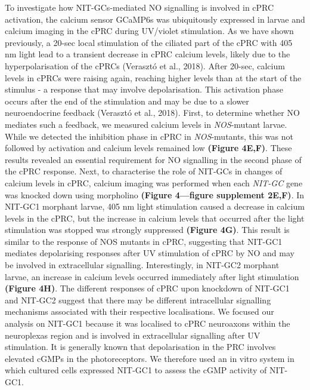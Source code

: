 \documentclass[
  10pt,
  onecolumn]{article}
\begin{document}
To investigate how NIT-GCs-mediated NO signalling is involved in cPRC
activation, the calcium sensor GCaMP6s was ubiquitously expressed in
larvae and calcium imaging in the cPRC during UV/violet stimulation. As
we have shown previously, a 20-sec local stimulation of the ciliated
part of the cPRC with 405 nm light lead to a transient decrease in cPRC
calcium levels, likely due to the hyperpolarisation of the cPRCs
(Verasztó et al., 2018). After 20-sec, calcium levels in cPRCs were
raising again, reaching higher levels than at the start of the stimulus
- a response that may involve depolarisation. This activation phase
occurs after the end of the stimulation and may be due to a slower
neuroendocrine feedback (Verasztó et al., 2018). First, to determine
whether NO mediates such a feedback, we measured calcium levels in
\emph{NOS}-mutant larvae. While we detected the inhibition phase in cPRC
in \emph{NOS}-mutants, this was not followed by activation and calcium
levels remained low \textbf{(Figure 4E,F)}. These results revealed an
essential requirement for NO signalling in the second phase of the cPRC
response. Next, to characterise the role of NIT-GCs in changes of
calcium levels in cPRC, calcium imaging was performed when each
\emph{NIT-GC} gene was knocked down using morpholino \textbf{(Figure
4---figure supplement 2E,F)}. In NIT-GC1 morphant larvae, 405 nm light
stimulation caused a decrease in calcium levels in the cPRC, but the
increase in calcium levels that occurred after the light stimulation was
stopped was strongly suppressed \textbf{(Figure 4G)}. This result is
similar to the response of NOS mutants in cPRC, suggesting that NIT-GC1
mediates depolarising responses after UV stimulation of cPRC by NO and
may be involved in extracellular signalling. Interestingly, in NIT-GC2
morphant larvae, an increase in calcium levels occurred immediately
after light stimulation \textbf{(Figure 4H)}. The different responses of
cPRC upon knockdown of NIT-GC1 and NIT-GC2 suggest that there may be
different intracellular signalling mechanisms associated with their
respective localisations. We focused our analysis on NIT-GC1 because it
was localised to cPRC neuroaxons within the neuroplexas region and is
involved in extracellular signalling after UV stimulation. It is
generally known that depolarisation in the PRC involves elevated cGMPs
in the photoreceptors. We therefore used an in vitro system in which
cultured cells expressed NIT-GC1 to assess the cGMP activity of NIT-GC1.
\end{document}
